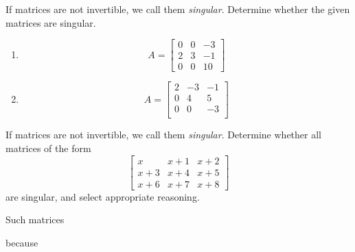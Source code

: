 \documentclass{ximera}
\author{Zack Reed}
\begin{document}
\begin{problem}
  If matrices are not invertible, we call them \emph{singular}. Determine whether the given matrices are singular.
  \begin{enumerate}
    
    \item $$A=\begin{bmatrix}0&0&-3\\2&3&-1\\0&0&10\end{bmatrix}$$
      \begin{multipleChoice}
      \end{multipleChoice}

     
    \item $$A=\begin{bmatrix}2&-3&-1\\0&4&5\\0&0&-3\\\end{bmatrix}$$
      \begin{multipleChoice}
      \end{multipleChoice}
      \end{enumerate}

\end{problem}

\begin{problem}\label{prob:singmatrixdet2} If matrices are not invertible, we call them \emph{singular}. Determine whether all matrices of the form
  $$\begin{bmatrix}x&x+1&x+2\\x+3&x+4&x+5\\x+6&x+7&x+8\end{bmatrix}$$
  are singular, and select appropriate reasoning.

  Such matrices \begin{multipleChoice}
     \end{multipleChoice}

     because \begin{selectAll}
     \end{selectAll}
  \end{problem}
\end{document}
